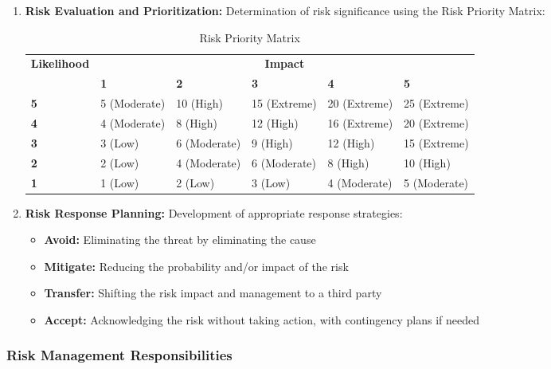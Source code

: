 \begin{enumerate}
    \item \textbf{Risk Evaluation and Prioritization:} Determination of risk significance using the Risk Priority Matrix:
    
    \begin{table}[h]
    \centering
    \begin{tabular}{|p{2cm}|p{2cm}|p{2cm}|p{2cm}|p{2cm}|p{2cm}|}
    \hline
    \multirow{2}{*}{\textbf{Likelihood}} & \multicolumn{5}{c|}{\textbf{Impact}} \\
    \cline{2-6}
    & \textbf{1} & \textbf{2} & \textbf{3} & \textbf{4} & \textbf{5} \\
    \hline
    \textbf{5} & 5 (Moderate) & 10 (High) & 15 (Extreme) & 20 (Extreme) & 25 (Extreme) \\
    \hline
    \textbf{4} & 4 (Moderate) & 8 (High) & 12 (High) & 16 (Extreme) & 20 (Extreme) \\
    \hline
    \textbf{3} & 3 (Low) & 6 (Moderate) & 9 (High) & 12 (High) & 15 (Extreme) \\
    \hline
    \textbf{2} & 2 (Low) & 4 (Moderate) & 6 (Moderate) & 8 (High) & 10 (High) \\
    \hline
    \textbf{1} & 1 (Low) & 2 (Low) & 3 (Low) & 4 (Moderate) & 5 (Moderate) \\
    \hline
    \end{tabular}
    \caption{Risk Priority Matrix}
    \end{table}
    
    \item \textbf{Risk Response Planning:} Development of appropriate response strategies:
    \begin{itemize}
        \item \textbf{Avoid:} Eliminating the threat by eliminating the cause
        \item \textbf{Mitigate:} Reducing the probability and/or impact of the risk
        \item \textbf{Transfer:} Shifting the risk impact and management to a third party
        \item \textbf{Accept:} Acknowledging the risk without taking action, with contingency plans if needed
    \end{itemize}
\end{enumerate}

\subsubsection{Risk Management Responsibilities} \label{sec:risk_responsibilities}


